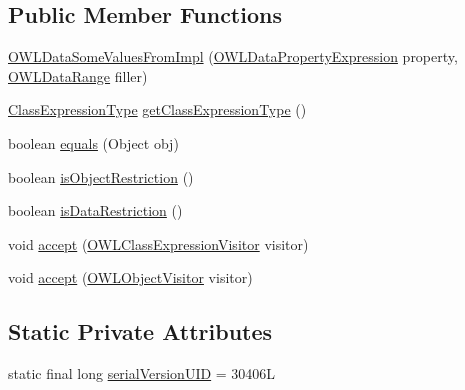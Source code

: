 \subsection*{Public Member Functions}
\begin{DoxyCompactItemize}
\item 
\hyperlink{classuk_1_1ac_1_1manchester_1_1cs_1_1owl_1_1owlapi_1_1_o_w_l_data_some_values_from_impl_a08efb571b491b48ffe1ea8a2a41f8a2d}{O\-W\-L\-Data\-Some\-Values\-From\-Impl} (\hyperlink{interfaceorg_1_1semanticweb_1_1owlapi_1_1model_1_1_o_w_l_data_property_expression}{O\-W\-L\-Data\-Property\-Expression} property, \hyperlink{interfaceorg_1_1semanticweb_1_1owlapi_1_1model_1_1_o_w_l_data_range}{O\-W\-L\-Data\-Range} filler)
\item 
\hyperlink{enumorg_1_1semanticweb_1_1owlapi_1_1model_1_1_class_expression_type}{Class\-Expression\-Type} \hyperlink{classuk_1_1ac_1_1manchester_1_1cs_1_1owl_1_1owlapi_1_1_o_w_l_data_some_values_from_impl_a1854ca2fb11f3405f9260e3ba7ca24ad}{get\-Class\-Expression\-Type} ()
\item 
boolean \hyperlink{classuk_1_1ac_1_1manchester_1_1cs_1_1owl_1_1owlapi_1_1_o_w_l_data_some_values_from_impl_a37dbeabe7f8f56a91bca8f31d31ec60d}{equals} (Object obj)
\item 
boolean \hyperlink{classuk_1_1ac_1_1manchester_1_1cs_1_1owl_1_1owlapi_1_1_o_w_l_data_some_values_from_impl_acabd80f340dd2c3f189332a7999489f6}{is\-Object\-Restriction} ()
\item 
boolean \hyperlink{classuk_1_1ac_1_1manchester_1_1cs_1_1owl_1_1owlapi_1_1_o_w_l_data_some_values_from_impl_acea51a03e3fa93a8c028624277aee29d}{is\-Data\-Restriction} ()
\item 
void \hyperlink{classuk_1_1ac_1_1manchester_1_1cs_1_1owl_1_1owlapi_1_1_o_w_l_data_some_values_from_impl_ade363daa9b857908f98d49fb3d453eac}{accept} (\hyperlink{interfaceorg_1_1semanticweb_1_1owlapi_1_1model_1_1_o_w_l_class_expression_visitor}{O\-W\-L\-Class\-Expression\-Visitor} visitor)
\item 
void \hyperlink{classuk_1_1ac_1_1manchester_1_1cs_1_1owl_1_1owlapi_1_1_o_w_l_data_some_values_from_impl_a2f33bd42574b1b2370a92ec2657550d5}{accept} (\hyperlink{interfaceorg_1_1semanticweb_1_1owlapi_1_1model_1_1_o_w_l_object_visitor}{O\-W\-L\-Object\-Visitor} visitor)
\end{DoxyCompactItemize}
\subsection*{Static Private Attributes}
\begin{DoxyCompactItemize}
\item 
static final long \hyperlink{classuk_1_1ac_1_1manchester_1_1cs_1_1owl_1_1owlapi_1_1_o_w_l_data_some_values_from_impl_af0d150c8c158766ef54f5ad20469bb84}{serial\-Version\-U\-I\-D} = 30406\-L
\end{DoxyCompactItemize}
